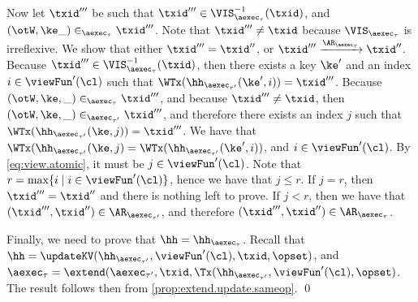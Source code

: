 \begin{itemize}
\begin{itemize}
Now let $\txid'''$ be such that $\txid''' \in \VIS^{-1}_{\aexec_{\tau}}(\txid)$, and $(\otW, \ke \_) \in_{\aexec_{\tau}} \txid'''$. 
Note that $\txid''' \neq \txid$ because $\VIS_{\aexec_{\tau}}$ is irreflexive.
We show that either $\txid''' = \txid''$, or $\txid''' \xrightarrow{\AR_{\aexec_{\tau}}} \txid''$. 
Because $\txid''' \in \VIS^{-1}_{\aexec_{\tau}}(\txid)$, then there exists a key $\ke'$ and an index $i \in \viewFun'(\cl)$ 
such that $\WTx(\hh_{\aexec_{\tau'}}(\ke', i)) = \txid'''$. Because $(\otW, \ke, \_) \in_{\aexec_{\tau}} \txid'''$, 
and because $\txid''' \neq \txid$, then $(\otW, \ke, \_) \in_{\aexec_{\tau'}} \txid'''$, and therefore there exists 
an index $j$ such that $\WTx(\hh_{\aexec_{\tau'}}(\ke, j)) = \txid'''$. We have that $\WTx(\hh_{\aexec_{\tau'}}(\ke, j) = 
\WTx(\hh_{\aexec_{\tau'}}(\ke', i))$, and $i \in \viewFun'(\cl)$. By \cref{eq:view.atomic}, it must be $j \in \viewFun'(\cl)$. 
Note that $r = \max\{i \mid i \in \viewFun'(\cl)\}$, hence we have that $j \leq r$. If $j = r$, then $\txid''' = \txid''$ and 
there is nothing left to prove. If $j < r$, then we have that $(\txid''', \txid'') \in \AR_{\aexec_{\tau'}}$, and 
therefore $(\txid''', \txid'') \in \AR_{\aexec_{\tau}}$.
\end{itemize}
Finally, we need to prove that $\hh = \hh_{\aexec_{\tau}}$.
Recall that $\hh = \updateKV(\hh_{\aexec_{\tau'}}, \viewFun'(\cl), \txid, \opset)$, 
and $\aexec_{\tau} = \extend(\aexec_{\tau'}, \txid, \Tx(\hh_{\aexec_{\tau'}}, \viewFun'(\cl), \opset)$. 
The result follows then from \cref{prop:extend.update.sameop}. \qed
%

\end{itemize}
